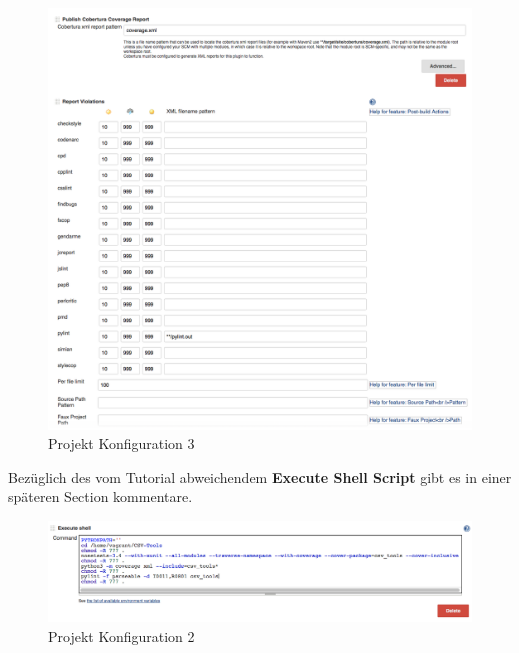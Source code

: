\begin{figure}[h!]
	\caption{Projekt Konfiguration 3}
	\centering
	\includegraphics[width=\textwidth, height=0.8\textheight]{images/jenkins_projectConfig3.png}
\end{figure}
\vfill
\clearpage

Bezüglich des vom Tutorial abweichendem \textbf{Execute Shell Script} gibt es in einer späteren Section kommentare.

\begin{figure}[h!]
	\caption{Projekt Konfiguration 2}
	\centering
	\includegraphics[width=\textwidth]{images/jenkins_projectConfig2.png}
\end{figure}